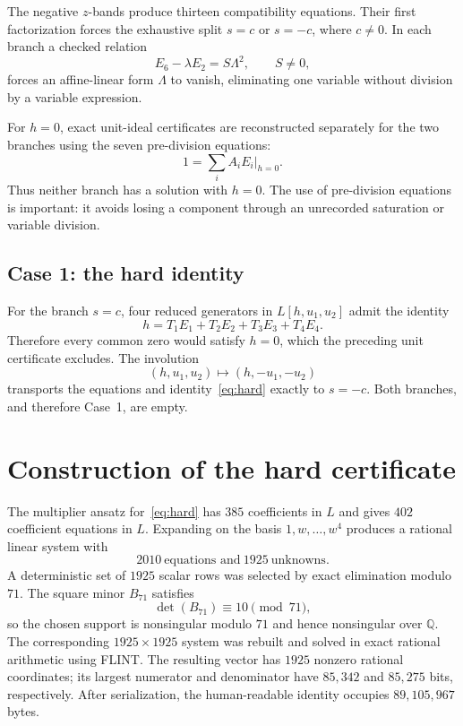 \documentclass[11pt,a4paper]{article}
\theoremstyle{remark}
\newcommand{\Q}{\mathbb{Q}}
\begin{document}
The negative $z$-bands produce thirteen compatibility equations. Their first factorization forces the exhaustive split $s=c$ or $s=-c$, where $c\neq0$. In each branch a checked relation
\[
E_6-\lambda E_2=S\Lambda^2,\qquad S\neq0,
\]
forces an affine-linear form $\Lambda$ to vanish, eliminating one variable without division by a variable expression.

For $h=0$, exact unit-ideal certificates are reconstructed separately for the two branches using the seven pre-division equations:
\[
1=\sum_i A_iE_i\big|_{h=0}.
\]
Thus neither branch has a solution with $h=0$. The use of pre-division equations is important: it avoids losing a component through an unrecorded saturation or variable division.

\subsection{Case 1: the hard identity}

For the branch $s=c$, four reduced generators in $L[h,u_1,u_2]$ admit the identity
\begin{equation}\label{eq:hard}
\boxed{h=T_1E_1+T_2E_2+T_3E_3+T_4E_4.}
\end{equation}
Therefore every common zero would satisfy $h=0$, which the preceding unit certificate excludes. The involution
\[
(h,u_1,u_2)\longmapsto(h,-u_1,-u_2)
\]
transports the equations and identity~\eqref{eq:hard} exactly to $s=-c$. Both branches, and therefore Case~1, are empty.

\section{Construction of the hard certificate}

The multiplier ansatz for~\eqref{eq:hard} has $385$ coefficients in $L$ and gives $402$ coefficient equations in $L$. Expanding on the basis $1,w,\ldots,w^4$ produces a rational linear system with
\[
2010\ \text{equations and}\ 1925\ \text{unknowns}.
\]
A deterministic set of $1925$ scalar rows was selected by exact elimination modulo $71$. The square minor $B_{71}$ satisfies
\[
\det(B_{71})\equiv10\pmod{71},
\]
so the chosen support is nonsingular modulo $71$ and hence nonsingular over $\Q$. The corresponding $1925\times1925$ system was rebuilt and solved in exact rational arithmetic using FLINT. The resulting vector has $1925$ nonzero rational coordinates; its largest numerator and denominator have $85{,}342$ and $85{,}275$ bits, respectively. After serialization, the human-readable identity occupies $89{,}105{,}967$ bytes.
\end{document}
